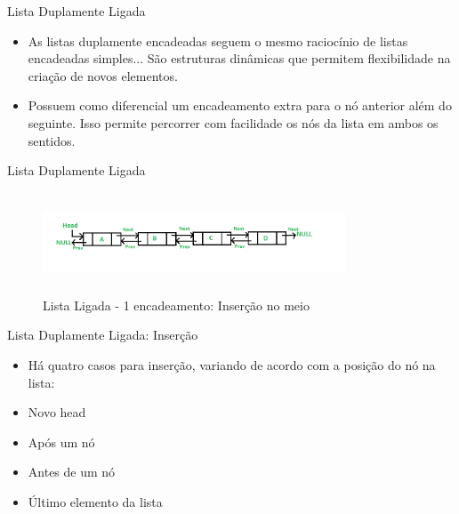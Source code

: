 \begin{frame}
	\begin{block}{Lista Duplamente Ligada}
	\begin{itemize}
			\item As listas duplamente encadeadas seguem o mesmo raciocínio de listas encadeadas simples... São estruturas dinâmicas que permitem flexibilidade na criação de novos elementos.

			\item Possuem como  diferencial um encadeamento extra para o nó anterior além do seguinte. Isso permite percorrer com facilidade os nós da lista em ambos os sentidos.
		\end{itemize}
	\end{block}
\end{frame}

\begin{frame}
	\begin{block}{Lista Duplamente Ligada}
		\begin{figure}[!htb]
			\centering	  				
			\includegraphics[height=3cm, width = 9cm]{./pic/DLL1.png}
			\caption{Lista Ligada - 1 encadeamento: Inserção no meio}
			\label{fig_LLS_six}
		\end{figure}
	\end{block}
\end{frame}

\begin{frame}
	\begin{block}{Lista Duplamente Ligada: Inserção}
	\begin{itemize}
			\item Há quatro casos para inserção, variando de acordo com a posição do nó na lista: 

			\item Novo head 
			
			\item Após um nó
			
			\item Antes de um nó
			
			\item Último elemento da lista
		\end{itemize}
	\end{block}
\end{frame}



